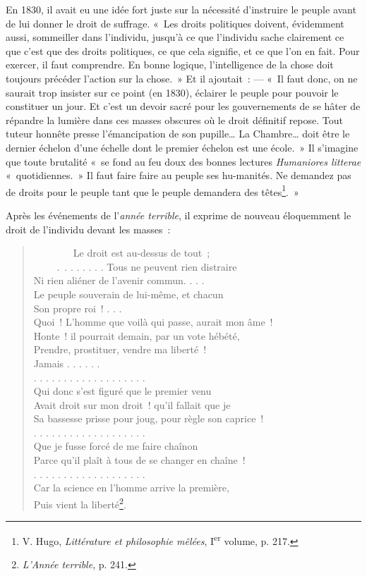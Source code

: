 \documentclass[french,twoside]{book} %
\begin{document}
En 1830, il avait eu une idée fort juste sur la nécessité d’instruire le peuple avant de lui donner le droit de suffrage. « Les droits politiques doivent, évidemment aussi, sommeiller dans l’individu, jusqu’à ce que l’individu sache clairement ce que c’est que des droits politiques, ce que cela signifie, et ce que l’on en fait. Pour exercer, il faut comprendre. En bonne logique, l’intelligence de la chose doit toujours précéder l’action sur la chose. » Et il ajoutait : — « Il faut donc, on ne saurait trop insister sur ce point (en 1830), éclairer le peuple pour pouvoir le constituer un jour. Et c’est un devoir sacré pour les gouvernements de se hâter de répandre la lumière dans ces masses obscures où le droit définitif repose. Tout tuteur honnête presse l’émancipation de son pupille… La Chambre… doit être le dernier échelon d’une échelle dont le premier échelon est une école. » Il s’imagine que toute brutalité « se fond au feu doux des bonnes lectures \emph{Humaniores litterae} « quotidiennes. » Il faut faire faire au peuple ses hu-manités. Ne demandez pas de droits pour le peuple tant que le peuple demandera des têtes\footnote{ V. Hugo, \emph{Littérature et philosophie mêlées}, I\textsuperscript{er} volume, p. 217.}. »\par
Après les événements de l’\emph{année terrible}, il exprime de nouveau éloquemment le droit de l’individu devant les masses :\par


\begin{verse}
        Le droit est au-dessus de tout ;\\
     . . . . . . . . Tous ne peuvent rien distraire\\
Ni rien aliéner de l’avenir commun. . . .\\
Le peuple souverain de lui-même, et chacun\\
Son propre roi ! . . .\\
Quoi ! L’homme que voilà qui passe, aurait mon âme !\\
Honte ! il pourrait demain, par un vote hébété,\\
Prendre, prostituer, vendre ma liberté !\\
Jamais . . . . . .\\
. . . . . . . . . . . . . . . . . . .\\
Qui donc s’est figuré que le premier venu\\
Avait droit sur mon droit ! qu’il fallait que je\\
Sa bassesse prisse pour joug, pour règle son caprice !\\
. . . . . . . . . . . . . . . . . . .\\
Que je fusse forcé de me faire chaînon\\
Parce qu’il plaît à tous de se changer en chaîne !\\
. . . . . . . . . . . . . . . . . . .\\
Car la science en l’homme arrive la première,\\
Puis vient la liberté\footnote{\emph{L’Année terrible}, p. 241.}.\\
\end{verse}
\end{document}
